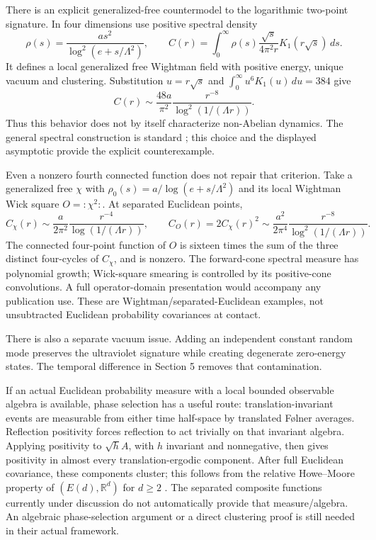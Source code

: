 \documentclass[11pt]{article}
\theoremstyle{remark}
\newcommand{\R}{\mathbb R}
\begin{document}
There is an explicit generalized-free countermodel to the logarithmic
two-point signature. In four dimensions use positive spectral density
\[
\rho(s)=\frac{a s^2}{\log^2(e+s/\Lambda^2)},\qquad
C(r)=\int_0^\infty \rho(s)
\frac{\sqrt s}{4\pi^2r}K_1(r\sqrt s)\,ds.
\]
It defines a local generalized free Wightman field with positive energy,
unique vacuum and clustering. Substitution $u=r\sqrt s$ and
$\int_0^\infty u^6K_1(u)\,du=384$ give
\[
C(r)\sim\frac{48a}{\pi^2}
\frac{r^{-8}}{\log^2(1/(\Lambda r))}.
\]
Thus this behavior does not by itself characterize non-Abelian dynamics.
The general spectral construction is standard \cite{dr}; this choice
and the displayed asymptotic provide the explicit counterexample.

Even a nonzero fourth connected function does not repair that criterion.
Take a generalized free $\chi$ with
$\rho_0(s)=a/\log(e+s/\Lambda^2)$ and its local Wightman Wick square
$O=:\chi^2:$. At separated Euclidean points,
\[
C_\chi(r)\sim\frac{a}{2\pi^2}
\frac{r^{-4}}{\log(1/(\Lambda r))},\qquad
C_O(r)=2C_\chi(r)^2
\sim\frac{a^2}{2\pi^4}
\frac{r^{-8}}{\log^2(1/(\Lambda r))}.
\]
The connected four-point function of $O$ is sixteen times the sum of
the three distinct four-cycles of $C_\chi$, and is nonzero.
The forward-cone spectral measure has polynomial growth; Wick-square
smearing is controlled by its positive-cone convolutions. A full
operator-domain presentation would accompany any publication use.
These are Wightman/separated-Euclidean examples, not unsubtracted
Euclidean probability covariances at contact.

There is also a separate vacuum issue. Adding an independent constant
random mode preserves the ultraviolet signature while creating
degenerate zero-energy states. The temporal difference in Section 5
removes that contamination.

If an actual Euclidean probability measure with a local bounded
observable algebra is available, phase selection has a useful route:
translation-invariant events are measurable from either time half-space
by translated Følner averages. Reflection positivity forces reflection
to act trivially on that invariant algebra. Applying positivity to
$\sqrt h A$, with $h$ invariant and nonnegative, then gives positivity
in almost every translation-ergodic component. After full Euclidean
covariance, these components cluster; this follows from the relative
Howe--Moore property of $(E(d),\R^d)$ for $d\geq2$ \cite{hm}.
The separated composite functions currently under discussion do not
automatically provide that measure/algebra. An algebraic phase-selection
argument or a direct clustering proof is still needed in their actual
framework.
\end{document}
